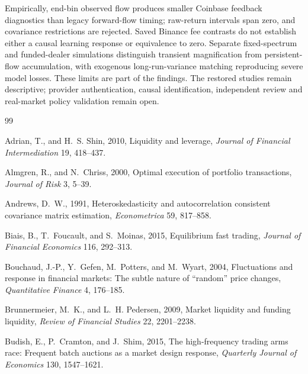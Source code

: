 \documentclass[12pt]{article}
\theoremstyle{definition}
\theoremstyle{remark}
\begin{document}
Empirically, end-bin observed flow produces smaller Coinbase feedback diagnostics than legacy forward-flow timing; raw-return intervals span zero, and covariance restrictions are rejected. Saved Binance fee contrasts do not establish either a causal learning response or equivalence to zero. Separate fixed-spectrum and funded-dealer simulations distinguish transient magnification from persistent-flow accumulation, with exogenous long-run-variance matching reproducing severe model losses. These limits are part of the findings. The restored studies remain descriptive; provider authentication, causal identification, independent review and real-market policy validation remain open.

\newpage
\begin{thebibliography}{99}
\small
\setlength{\itemsep}{0.0pt plus 0.3pt}
\setlength{\parsep}{0.0pt}

Adrian, T., and H.~S. Shin, 2010, Liquidity and leverage, \emph{Journal of Financial Intermediation} 19, 418--437.

Almgren, R., and N.~Chriss, 2000, Optimal execution of portfolio transactions, \emph{Journal of Risk} 3, 5--39.

Andrews, D.~W., 1991, Heteroskedasticity and autocorrelation consistent covariance matrix estimation, \emph{Econometrica} 59, 817--858.

Biais, B., T.~Foucault, and S.~Moinas, 2015, Equilibrium fast trading, \emph{Journal of Financial Economics} 116, 292--313.

Bouchaud, J.-P., Y.~Gefen, M.~Potters, and M.~Wyart, 2004, Fluctuations and response in financial markets: The subtle nature of ``random'' price changes, \emph{Quantitative Finance} 4, 176--185.

Brunnermeier, M.~K., and L.~H. Pedersen, 2009, Market liquidity and funding liquidity, \emph{Review of Financial Studies} 22, 2201--2238.

Budish, E., P.~Cramton, and J.~Shim, 2015, The high-frequency trading arms race: Frequent batch auctions as a market design response, \emph{Quarterly Journal of Economics} 130, 1547--1621.


\end{thebibliography}
\end{document}
